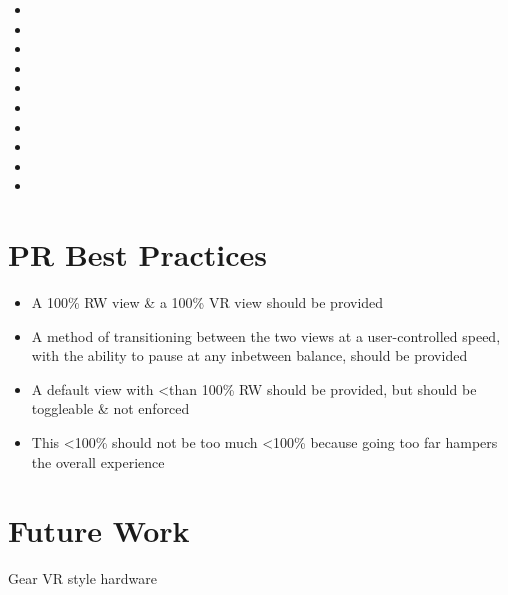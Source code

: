 \begin{itemize}
	\item 
	\item 
	\item 
	\item 
	\item 
	\item 
	\item 
	\item 
	\item 
	\item 
\end{itemize}


\section{PR Best Practices}

\begin{itemize}
	\item A 100\% RW view \& a 100\% VR view should be provided
	\item A method of transitioning between the two views at a user-controlled speed, with the ability to pause at any inbetween balance, should be provided
	\item A default view with \textless than 100\% RW should be provided, but should be toggleable \& not enforced
	\item This \textless 100\% should not be too much \textless 100\% because going too far hampers the overall experience
\end{itemize}




\section{Future Work}

Gear VR style hardware